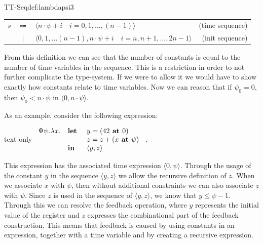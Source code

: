 \begin{definitiontitled}{TT-Seq}{def:lambdapsi3}
\begin{tabular}{lclr}
$s$     & $\Coloneqq$ & $\langle n \cdot \psi + i \quad i = 0,1,\ldots,(n-1) \rangle$ & (time sequence)\\
        & |           & $\langle 0, 1, \ldots (n-1), n \cdot \psi + i \quad i = n,n+1,\ldots,2n-1 \rangle$ & (init sequence)\\
\end{tabular}
\end{definitiontitled}

From this definition we can see that the number of constants is equal to the number of time variables in the sequence.
This is a restriction in order to not further complicate the type-system.
If we were to allow it we would have to show exactly how constants relate to time variables.
Now we can reason that if $\psi_0 = 0$, then $\psi_0 < n \cdot \psi$ in $\langle 0, n \cdot \psi \rangle$. 

As an example, consider the following expression:
\begin{changemargin}{1cm}{0cm}
\begin{expansionno}{text only}
$
\begin{array}{l l l} 
\Psi \psi. \lambda x. & \textbf{let } & y = (42 \textbf{ at } 0)\\
                      &               & z = z + (x \textbf{ at } \psi) \\
& \textbf{in } & \langle y, z \rangle \\
\end{array}$
.
\end{expansionno}
\end{changemargin}
This expression has the associated time expression $\langle 0, \psi \rangle$.
Through the usage of the constant $y$ in the sequence $\langle y, z \rangle$ we allow the recursive definition of $z$.
When we associate $x$ with $\psi$, then without additional constraints we can also associate $z$ with $\psi$.
Since $z$ is used in the sequence of $\langle y, z \rangle$, we know that $y \le \psi - 1$.
Through this we can resolve the feedback operation, where $y$ represents the initial value of the register and $z$ expresses the combinational part of the feedback construction.
This means that feedback is caused by using constants in an expression, together with a time variable and by creating a recursive expression.

